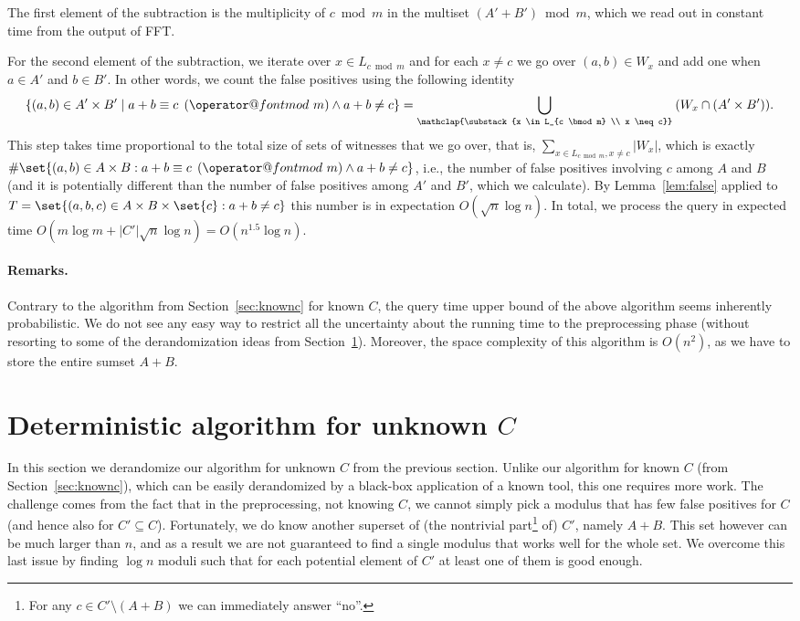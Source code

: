\documentclass[10pt,a4paper]{article}
\makeatletter
\newcommand{\tpmod}[1]{\mkern 8mu({\operator@font mod}\mkern 6mu#1)}
\makeatother
\begin{document}
The first element of the subtraction is the multiplicity of $c \bmod m$ in the multiset $(A'+B') \bmod m$, which we read out in constant time from the output of FFT.

For the second element of the subtraction, we iterate over $x \in L    _{c \bmod m}$ and for each $x \neq c$ we go over $(a,b) \in W_x$ and add one when $a \in A'$ and $b \in B'$. In other words, we count the false positives using the following identity
\[
\{(a,b) \in A' \times B' \mid a + b \equiv c \tpmod{m} \land a + b \neq c\}
= \bigcup_{\mathclap{\substack{x \in L_{c \bmod m} \\ x \neq c}}} \: (W_x \cap (A' \times B')).
\]
This step takes time proportional to the total size of sets of witnesses that we go over, that is, $\sum_{x \in L_{c \bmod m}, x \neq c} |W_x|$, which is exactly
$\#\set{(a, b) \in A \times B : a+b \equiv c \tpmod{m} \land a+b\neq c}$, i.e., the number of false positives involving $c$ among $A$ and $B$ (and it is potentially different than the number of false positives among $A'$ and $B'$, which we calculate). By Lemma~\ref{lem:false} applied to $T = \set{(a,b,c) \in A \times B \times \set{c} : a + b \neq c}$ this number is in expectation $O(\sqrt{n} \log n)$. In total, we process the query in expected time $O(m \log m + |C'|\sqrt{n}\log n) = O(n^{1.5}\log n)$.

\paragraph{Remarks.}
Contrary to the algorithm from Section~\ref{sec:knownc} for known $C$, the query time upper bound of the above algorithm seems inherently probabilistic. We do not see any easy way to restrict all the uncertainty about the running time to the preprocessing phase (without resorting to some of the derandomization ideas from Section~\ref{sec:unknowncdet}). Moreover, the space complexity of this algorithm is $O(n^2)$, as we have to store the entire sumset $A+B$.

\section{Deterministic algorithm for unknown \texorpdfstring{$C$}{C}}
\label{sec:unknowncdet}

In this section we derandomize our algorithm for unknown $C$ from the previous section. Unlike our algorithm for known $C$ (from Section~\ref{sec:knownc}), which can be easily derandomized by a black-box application of a known tool, this one requires more work. The challenge comes from the fact that in the preprocessing, not knowing $C$, we cannot simply pick a modulus that has few false positives for $C$ (and hence also for $C' \subseteq C$). Fortunately, we do know another superset of (the nontrivial part\footnote{For any $c\in C'\setminus (A+B)$ we can immediately answer ``no''.} of) $C'$, namely $A+B$. This set however can be much larger than $n$, and as a result we are not guaranteed to find a single modulus that works well for the whole set. We overcome this last issue by finding $\log n$ moduli such that for each potential element of $C'$ at least one of them is good enough.
\end{document}
